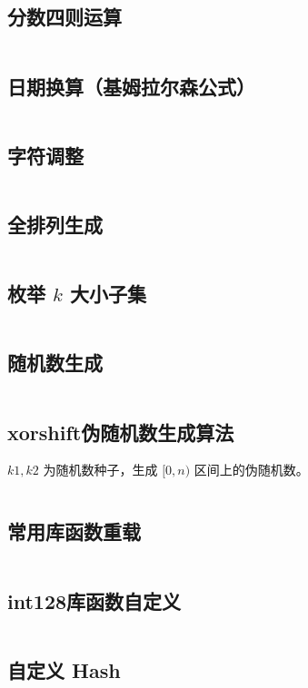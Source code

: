 \documentclass[a4paper, twoside]{article}
\begin{document}
\subsection{分数四则运算}
\inputminted{cpp}{../src/杂项/分数四则运算.cpp}

\subsection{日期换算（基姆拉尔森公式）}
\inputminted{cpp}{../src/杂项/日期换算（基姆拉尔森公式）.cpp}

\subsection{字符调整}
\inputminted{cpp}{../src/杂项/字符调整.cpp}

\subsection{全排列生成}
\inputminted{cpp}{../src/杂项/全排列生成.cpp}

\subsection{枚举 $k$ 大小子集}
\inputminted{cpp}{../src/杂项/枚举k大小子集.cpp}

\subsection{随机数生成}
\inputminted{cpp}{../src/杂项/随机数生成.cpp}

\subsection{xorshift伪随机数生成算法}
$k1, k2$ 为随机数种子，生成 $[0, n)$ 区间上的伪随机数。
\inputminted{cpp}{../src/杂项/xorshift伪随机数生成算法.cpp}

\subsection{常用库函数重载}
\inputminted{cpp}{../src/杂项/常用库函数重载.cpp}

\subsection{int128库函数自定义}
\inputminted{cpp}{../src/杂项/int128库函数自定义.cpp}

\subsection{自定义 Hash}
\inputminted{cpp}{../src/杂项/自定义Hash.cpp}
\end{document}
